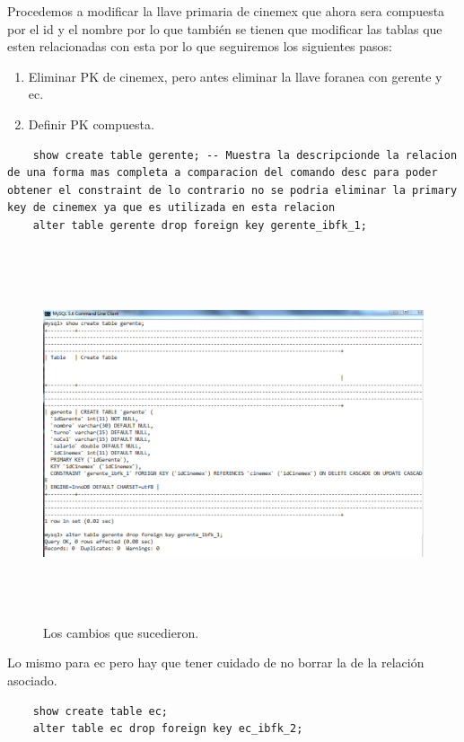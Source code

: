 \documentclass[12pt, titlepage]{article}
\begin{document}
    Procedemos a modificar la llave primaria de cinemex que ahora sera compuesta por el id y el nombre por lo que también se tienen que modificar las tablas que esten relacionadas con esta por lo que seguiremos los siguientes pasos:
    \begin{enumerate}  
        \item Eliminar PK de cinemex, pero antes eliminar la llave foranea con gerente y ec. 
        \item Definir PK compuesta.
    \end{enumerate}
    \begin{lstlisting}
    show create table gerente; -- Muestra la descripcionde la relacion de una forma mas completa a comparacion del comando desc para poder obtener el constraint de lo contrario no se podria eliminar la primary key de cinemex ya que es utilizada en esta relacion
    alter table gerente drop foreign key gerente_ibfk_1;
    \end{lstlisting}
    \begin{figure}[H]
        \begin{center}
            \includegraphics[width=15cm, height=11cm]{img/drop-fk.png}
            \caption{Los cambios que sucedieron.}
            \label{fig:drop-fk}
        \end{center}
    \end{figure}
    Lo mismo para ec pero hay que tener cuidado de no borrar la de la relación asociado. 
    \begin{lstlisting}
    show create table ec;
    alter table ec drop foreign key ec_ibfk_2;
    \end{lstlisting}
\end{document}
